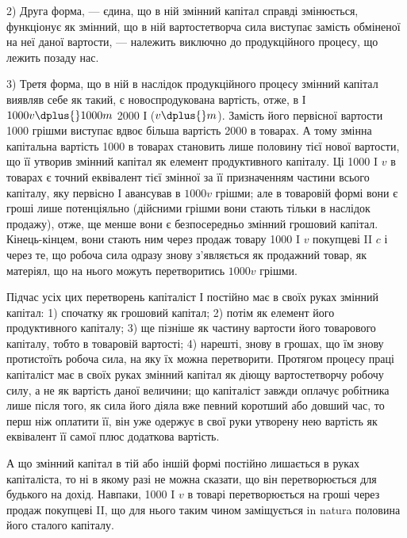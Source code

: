 2) Друга форма, — єдина, що в ній змінний капітал справді змінюється,
функціонує як змінний, що в ній вартостетворча сила виступає замість
обміненої на неї даної вартости, — належить виключно до продукційного
процесу, що лежить позаду нас.

3) Третя форма, що в ній в наслідок продукційного процесу змінний
капітал виявляв себе як такий, є новоспродукована вартість, отже,
в І \deq{} $1000 v \dplus{} 1000 m$ \deq{} 2000 І ($v \dplus{} m$). Замість його первісної вартости \deq{}
1000 грішми виступає вдвоє більша вартість \deq{} 2000 в товарах.
А тому змінна капітальна вартість \deq{} 1000 в товарах становить лише
половину тієї нової вартости, що її утворив змінний капітал як елемент
продуктивного капіталу. Ці 1000 I $v$ в товарах є точний еквівалент тієї
змінної за її призначенням частини всього капіталу, яку первісно І авансував
в $1000v$ грішми; але в товаровій формі вони є гроші лише потенціяльно
(дійсними грішми вони стають тільки в наслідок продажу), отже,
ще менше вони є безпосередньо змінний грошовий капітал. Кінець-кінцем,
вони стають ним через продаж товару 1000 I $v$ покупцеві II $c$ і через
те, що робоча сила одразу знову з’являється як продажний товар, як
матеріял, що на нього можуть перетворитись $1000v$ грішми.

Підчас усіх цих перетворень капіталіст І постійно має в своїх руках
змінний капітал: 1) спочатку як грошовий капітал; 2) потім як елемент
його продуктивного капіталу; 3) ще пізніше як частину вартости його
товарового капіталу, тобто в товаровій вартості; 4) нарешті, знову в грошах,
що їм знову протистоїть робоча сила, на яку їх можна перетворити.
Протягом процесу праці капіталіст має в своїх руках змінний капітал як
діющу вартостетворчу робочу силу, а не як вартість даної величини;
що капіталіст завжди оплачує робітника лише після того, як сила його
діяла вже певний коротший або довший час, то перш ніж оплатити її,
він уже одержує в свої руки утворену нею вартість як еквівалент її
самої плюс додаткова вартість.

А що змінний капітал в тій або іншій формі постійно
лишається в руках капіталіста, то ні в якому
разі не можна сказати, що він перетворюється для будького
на дохід. Навпаки, 1000 I $v$ в товарі перетворюється на гроші
через продаж покупцеві II, що для нього таким чином заміщується
in natura половина його сталого капіталу.

